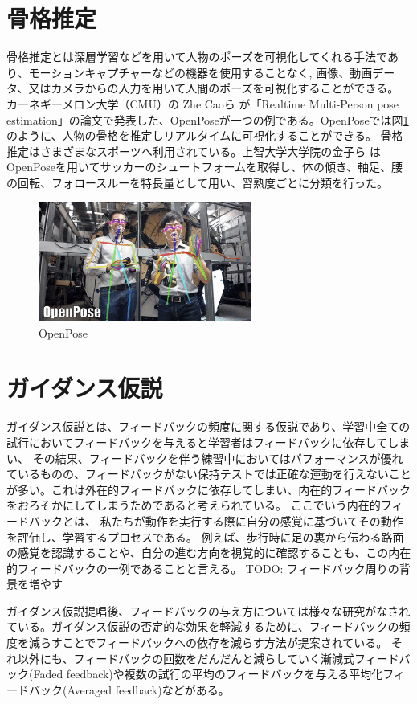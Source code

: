 \section{骨格推定}
骨格推定とは深層学習などを用いて人物のポーズを可視化してくれる手法であり、モーションキャプチャーなどの機器を使用することなく,
画像、動画データ、又はカメラからの入力を用いて人間のポーズを可視化することができる。
カーネギーメロン大学（CMU）の Zhe Caoら が「Realtime Multi-Person pose estimation」\cite{openpose}の論文で発表した、OpenPoseが一つの例である。OpenPoseでは図\ref{fig:openpose}のように、人物の骨格を推定しリアルタイムに可視化することができる。
骨格推定はさまざまなスポーツへ利用されている。上智大学大学院の金子ら \cite{soccer_openpose}はOpenPoseを用いてサッカーのシュートフォームを取得し、体の傾き、軸足、腰の回転、フォロースルーを特長量として用い、習熟度ごとに分類を行った。
\begin{figure}[htbp]
    \begin{center}
        \includegraphics[width=7cm]{figures/openpose.png}
        \caption{OpenPose}
        \label{fig:openpose}
    \end{center}
  \end{figure}
\section{ガイダンス仮説}
ガイダンス仮説\cite{guidance_hypothesis}とは、フィードバックの頻度に関する仮説であり、学習中全ての試行においてフィードバックを与えると学習者はフィードバックに依存してしまい、
その結果、フィードバックを伴う練習中においてはパフォーマンスが優れているものの、フィードバックがない保持テストでは正確な運動を行えないことが多い。これは外在的フィードバックに依存してしまい、内在的フィードバックをおろそかにしてしまうためであると考えられている。
ここでいう内在的フィードバックとは、
私たちが動作を実行する際に自分の感覚に基づいてその動作を評価し、学習するプロセスである。
例えば、歩行時に足の裏から伝わる路面の感覚を認識することや、自分の進む方向を視覚的に確認することも、この内在的フィードバックの一例であることと言える。\cite{nagoyahml_feedback}
TODO: フィードバック周りの背景を増やす

ガイダンス仮説提唱後、フィードバックの与え方については様々な研究がなされている。ガイダンス仮説の否定的な効果を軽減するために、フィードバックの頻度を減らすことでフィードバックへの依存を減らす方法が提案されている。
それ以外にも、フィードバックの回数をだんだんと減らしていく漸減式フィードバック(Faded feedback)\cite{Aoyagi2019}や複数の試行の平均のフィードバックを与える平均化フィードバック(Averaged feedback)\cite{Aoyagi2019}などがある。
